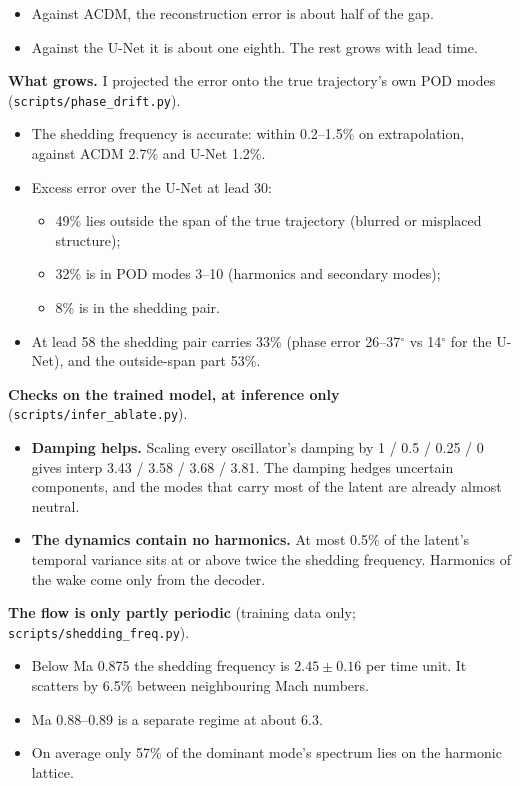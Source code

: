 \begin{itemize}
\item Against ACDM, the reconstruction error is about half of the gap.
\item Against the U-Net it is about one eighth. The rest grows with lead time.
\end{itemize}

\textbf{What grows.} I projected the error onto the true trajectory's own POD modes
(\texttt{scripts/phase\_drift.py}).
\begin{itemize}
\item The shedding frequency is accurate: within 0.2--1.5\% on extrapolation, against
  ACDM 2.7\% and U-Net 1.2\%.
\item Excess error over the U-Net at lead 30:
  \begin{itemize}
  \item 49\% lies outside the span of the true trajectory (blurred or misplaced structure);
  \item 32\% is in POD modes 3--10 (harmonics and secondary modes);
  \item 8\% is in the shedding pair.
  \end{itemize}
\item At lead 58 the shedding pair carries 33\% (phase error 26--37$^\circ$ vs 14$^\circ$ for
  the U-Net), and the outside-span part 53\%.
\end{itemize}

\textbf{Checks on the trained model, at inference only} (\texttt{scripts/infer\_ablate.py}).
\begin{itemize}
\item \textbf{Damping helps.} Scaling every oscillator's damping by 1 / 0.5 / 0.25 / 0
  gives interp 3.43 / 3.58 / 3.68 / 3.81. The damping hedges uncertain components, and the
  modes that carry most of the latent are already almost neutral.
\item \textbf{The dynamics contain no harmonics.} At most 0.5\% of the latent's temporal
  variance sits at or above twice the shedding frequency. Harmonics of the wake come only
  from the decoder.
\end{itemize}

\textbf{The flow is only partly periodic} (training data only;
\texttt{scripts/shedding\_freq.py}).
\begin{itemize}
\item Below Ma 0.875 the shedding frequency is $2.45\pm0.16$ per time unit. It scatters by
  6.5\% between neighbouring Mach numbers.
\item Ma 0.88--0.89 is a separate regime at about 6.3.
\item On average only 57\% of the dominant mode's spectrum lies on the harmonic lattice.
\end{itemize}

